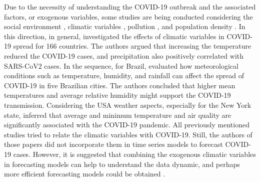 Due to the necessity of understanding the \ac{COVID-19} outbreak and the associated factors, or exogenous variables, some studies are being conducted considering the social environment \cite{ribeiro2021Ensemble, li2023Investigating}, climatic variables \cite{prata2020Temperature, ahmadi2020Investigation, yin2022Meteorological}, pollution \cite{jerrett2023Air}, and population density \cite{coccia2020Factors}. In this direction, in general,  investigated the effects of climatic variables in \ac{COVID-19} spread for 166 countries. The authors argued that increasing the temperature reduced the \ac{COVID-19} cases, and precipitation also positively correlated with \ac{SARS-CoV2} cases. In the sequence, for Brazil,  evaluated how meteorological conditions such as temperature, humidity, and rainfall can affect the spread of \ac{COVID-19} in five Brazilian cities. The authors concluded that higher mean temperatures and average relative humidity might support the \ac{COVID-19} transmission. Considering the \ac{USA} weather aspects, especially for the New York state,  inferred that average and minimum temperature and air quality are significantly associated with the \ac{COVID-19} pandemic. All previously mentioned studies tried to relate the climatic variables with \ac{COVID-19}. Still, the authors of those papers did not incorporate them in time series models to forecast \ac{COVID-19} cases. However, it is suggested that combining the exogenous climatic variables in forecasting models can help to understand the data dynamic, and perhaps more efficient forecasting models could be obtained \cite{ribeiro2020Ensemble}.

